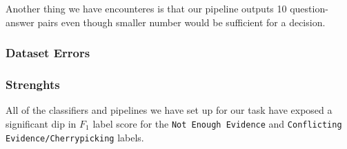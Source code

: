 Another thing we have encounteres is that our pipeline outputs 10 question-answer pairs even though smaller number would be sufficient for a decision.
\subsubsection*{Dataset Errors}

\subsubsection*{Strenghts}

All of the classifiers and pipelines we have set up for our task have exposed a significant dip in $F_1$ label score for the \texttt{Not Enough Evidence} and \texttt{Conflicting Evidence/Cherrypicking} labels.


